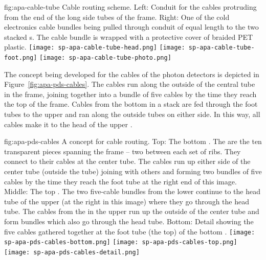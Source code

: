\begin{dunefigure}{fig:apa-cable-tube}
{Cable routing scheme. Left: Conduit for the  cables protruding from the end of the long side tubes of the  frame.  Right: One of the cold electronics cable bundles being pulled through conduit of equal length to the two stacked s.  The cable bundle is wrapped with a protective cover of braided PET plastic.  }
\texttt{[image: sp-apa-cable-tube-head.png]} \quad
\texttt{[image: sp-apa-cable-tube-foot.png]} \quad
\texttt{[image: sp-apa-cable-tube-photo.png]}
\end{dunefigure}

The concept being developed for the cables of the photon detectors is depicted in Figure~\ref{fig:apa-pds-cables}.  The cables run along the outside of the central tube in the  frame, joining together into a bundle of five cables by the time they reach the top of the frame.  Cables from the bottom  in a stack are fed through the foot tubes to the upper  and ran along the outside tubes on either side.  In this way, all  cables make it to the head of the upper .  

\begin{dunefigure}{fig:apa-pds-cables}
{%
A concept for  cable routing. Top: The bottom .  The  are the ten transparent pieces spanning the frame -- two between each set of ribs.  They connect to their cables at the center tube.  The cables run up either side of the center tube (outside the tube) joining with others and forming two bundles of five cables by the time they reach the foot tube at the right end of this image. Middle: The top . The two five-cable bundles from the lower  continue to the head tube of the upper  (at the right in this image) where they go through the head tube.  The cables from the  in the upper  run up the outside of the center tube and form bundles which also go through the head tube. Bottom: Detail showing the five  cables gathered together at the foot tube (the top) of the bottom .}
\texttt{[image: sp-apa-pds-cables-bottom.png]}
\hspace*{4mm}\texttt{[image: sp-apa-pds-cables-top.png]}
\vspace{5mm} \\
\hspace*{-10mm}\texttt{[image: sp-apa-pds-cables-detail.png]}
\end{dunefigure}





